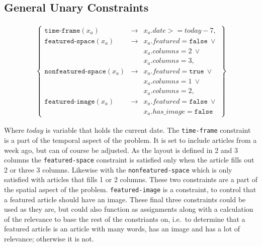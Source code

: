 \subsection*{General Unary Constraints}
\vspace{-30pt}
\begin{align}
	\begin{Bmatrix}
		\texttt{time-frame}(x_a) &\rightarrow& x_a.date >= today-7,\\
		\texttt{featured-space}(x_a) &\rightarrow& x_a.featured = \texttt{false}\ \vee\\
			&&x_a.columns = 2\ \vee\\
			&&x_a.columns = 3,\\
		\texttt{nonfeatured-space}(x_a) &\rightarrow& x_a.featured = \texttt{true}\ \vee\\
			&&x_a.columns = 1\ \vee\\
			&&x_a.columns = 2,\\
		\texttt{featured-image}(x_a) &\rightarrow& x_a.featured = \texttt{false}\ \vee\\
			&&x_a.has\_image = \texttt{false}
	\end{Bmatrix}
	\label{eq:general_unary}
\end{align}

Where $today$ is variable that holds the current date. The \texttt{time-frame} constraint is a part of the temporal aspect of the problem. It is set to include articles from a week ago, but can of course be adjusted. As the layout is defined in 2 and 3 columns the \texttt{featured-space} constraint is satisfied only when the article fills out 2 or three 3 columns. Likewise with the \texttt{nonfeatured-space} which is only satisfied with articles that fills 1 or 2 columns. These two constraints are a part of the spatial aspect of the problem. \texttt{featured-image} is a constraint, to control that a featured article should have an image. These final three constraints could be used as they are, but could also function as assignments along with a calculation of the relevance to base the rest of the constriants on, i.e.\ to determine that a featured article is an article with many words, has an image and has a lot of relevance; otherwise it is not.

